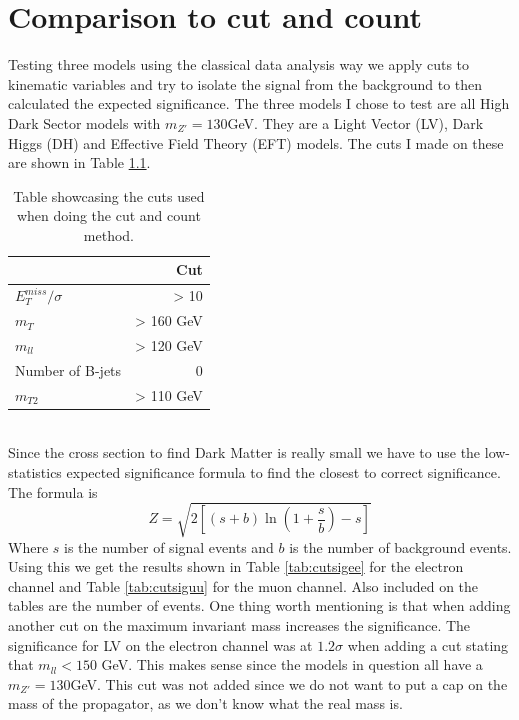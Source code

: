 \documentclass[14pt, a4paper]{book}
\begin{document}
\chapter{Comparison to cut and count}
Testing three models using the classical data analysis way we apply cuts to kinematic variables and try to isolate the signal from the background to then calculated the expected significance. The three models I chose to test are all High Dark Sector models with $m_{Z'}=130$GeV. They are a Light Vector (LV), Dark Higgs (DH) and Effective Field Theory (EFT) models. The cuts I made on these are shown in Table \ref{tab:cuts}.
\begin{table}[!h]
    \centering
    \begin{tabular}{l|r}\midrule\midrule
                                & Cut\\\midrule
         $E_T^{miss}/\sigma$    & > 10      \\
         $m_T$                  & > 160 GeV \\
         $m_{ll}$               & > 120 GeV \\
         Number of B-jets       & 0         \\
         $m_{T2}$               & > 110 GeV \\\midrule\midrule
    \end{tabular}
    \caption[Cut and count cuts]{Table showcasing the cuts used when doing the cut and count method.}
    \label{tab:cuts}
\end{table}
\\ Since the cross section to find Dark Matter is really small we have to use the low-statistics expected significance formula to find the closest to correct significance. The formula is
\begin{equation}\label{eq:low_stat_Z}
    Z = \sqrt{2\left[(s + b)\ln(1 + \frac{s}{b}) - s \right]}
\end{equation}
Where $s$ is the number of signal events and $b$ is the number of background events. Using this we get the results shown in Table \ref{tab:cutsigee} for the electron channel and Table \ref{tab:cutsiguu} for the muon channel. Also included on the tables are the number of events. One thing worth mentioning is that when adding another cut on the maximum invariant mass increases the significance. The significance for LV on the electron channel was at $1.2\sigma$ when adding a cut stating that $m_{ll}<150$ GeV. This makes sense since the models in question all have a $m_{Z'}=130$GeV. This cut was not added since we do not want to put a cap on the mass of the propagator, as we don't know what the real mass is.
\end{document}
